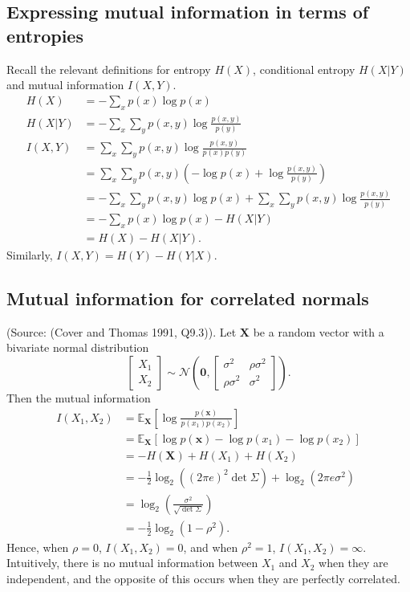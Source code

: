 \documentclass{article}
\begin{document}
\subsection{Expressing mutual information in terms of entropies}
Recall the relevant definitions for entropy $H(X)$, conditional entropy $H(X|Y)$ and mutual information $I(X,Y)$.
\begin{align*}
H(X) &= -\sum_x p(x) \log p(x)\\
H(X|Y) &= -\sum_x \sum_y p(x,y) \log\frac{p(x,y)}{p(y)}\\
I(X,Y) &= \sum_x \sum_y p(x,y) \log\frac{p(x,y)}{p(x)p(y)}\\
&= \sum_x \sum_y p(x,y) \left( -\log{p(x)} + \log\frac{p(x,y)}{p(y)} \right)\\
&= -\sum_x \sum_y p(x,y)\log{p(x)} + \sum_x \sum_y p(x,y) \log\frac{p(x,y)}{p(y)}\\
&= -\sum_x p(x)\log{p(x)} - H(X|Y)\\
&= H(X) - H(X|Y).
\end{align*}
Similarly, $I(X,Y) = H(Y) - H(Y|X)$.

\subsection{Mutual information for correlated normals}
(Source: (Cover and Thomas 1991, Q9.3)). Let $\mathbf{X}$ be a random vector with a bivariate normal distribution
\begin{equation*}
\begin{bmatrix}X_1\\X_2\end{bmatrix} \sim \mathcal{N}\left(\mathbf{0}, \begin{bmatrix}\sigma^2&\rho\sigma^2\\\rho\sigma^2&\sigma^2\end{bmatrix}\right).
\end{equation*}
Then the mutual information
\begin{align*}
I(X_1, X_2) &= \mathbb{E}_{\mathbf{X}}\left[ \log\frac{p(\mathbf{x})}{p(x_1)p(x_2)} \right]\\
&= \mathbb{E}_{\mathbf{X}}[\log{p(\mathbf{x})} - \log{p(x_1)} - \log{p(x_2)}]\\
&= -H(\mathbf{X}) + H(X_1) + H(X_2)\\
&= -\frac{1}{2}\log_2\left((2\pi e)^2\det\Sigma\right) + \log_2\left(2\pi e\sigma^2\right)\\
&= \log_2\left(\frac{\sigma^2}{\sqrt{\det\Sigma}}\right)\\
&= -\frac{1}{2}\log_2(1-\rho^2).
\end{align*}
Hence, when $\rho = 0$, $I(X_1,X_2) = 0$, and when $\rho^2 = 1$, $I(X_1,X_2) = \infty$. Intuitively, there is no mutual information between $X_1$ and $X_2$ when they are independent, and the opposite of this occurs when they are perfectly correlated.
\end{document}
